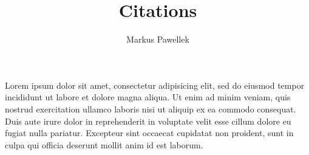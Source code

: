 \documentclass{article}
\title{Citations}
\author{Markus Pawellek}
\begin{document}
  \maketitle

  Lorem ipsum dolor sit amet, consectetur adipisicing elit, sed do eiusmod
  tempor incididunt ut labore et dolore magna aliqua. Ut enim ad minim veniam,
  quis nostrud exercitation ullamco laboris nisi ut aliquip ex ea commodo
  consequat. Duis aute irure dolor in reprehenderit in voluptate velit esse
  cillum dolore eu fugiat nulla pariatur. Excepteur sint occaecat cupidatat non
  proident, sunt in culpa qui officia deserunt mollit anim id est laborum.
  \cite[S.~49]{Schweizer2013}


  {}
  
\end{document}
